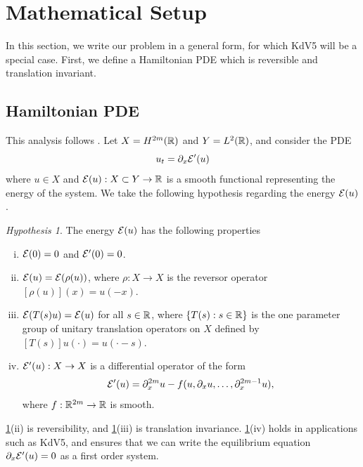 \documentclass[11pt,reqno]{amsart}
\theoremstyle{plain}
\theoremstyle{definition}
\theoremstyle{remark}
\newtheorem{hypothesis}[theorem]{Hypothesis}
\begin{document}
\section{Mathematical Setup}\label{sec:setup}

In this section, we write our problem in a general form, for which KdV5 will be a special case. First, we define a Hamiltonian PDE which is reversible and translation invariant.

\subsection{Hamiltonian PDE}\label{sec:HamPDE}

This analysis follows \cite{Grillakis1987}. Let $X = H^{2m}(\mathbb{R})$ and $Y = L^2(\mathbb{R})$, and consider the PDE
\begin{equation}\label{genPDE}
u_t = \partial_x \mathcal{E}'(u)
\end{equation}
where $u \in X$ and $\mathcal{E}(u): X \subset Y \rightarrow \mathbb{R}$ is a smooth functional representing the energy of the system. We take the following hypothesis regarding the energy $\mathcal{E}(u)$.

\begin{hypothesis}\label{Ehyp}
The energy $\mathcal{E}(u)$ has the following properties
\begin{enumerate}[(i)]
\item $\mathcal{E}(0) = 0$ and $\mathcal{E}'(0) = 0$.
\item $\mathcal{E}(u) = \mathcal{E}(\rho(u))$, where $\rho: X \rightarrow X$ is the reversor operator $[\rho(u)](x) = u(-x)$.
\item $\mathcal{E}(T(s)u) = \mathcal{E}(u)$ for all $s \in \mathbb{R}$, where $\{T(s) : s \in \mathbb{R} \}$ is the one parameter group of unitary translation operators on $X$ defined by $[T(s)]u(\cdot) = u(\cdot - s)$.
\item $\mathcal{E}'(u): X \rightarrow X$ is a differential operator of the form
\begin{equation}\label{Eprimeuform}
\mathcal{E}'(u) = \partial_x^{2m}u - f(u, \partial_x u, \dots, \partial_x^{2m-1} u),
\end{equation}
where $f: \mathbb{R}^{2m} \rightarrow \mathbb{R}$ is smooth.
\end{enumerate}
\end{hypothesis}

\noi \cref{Ehyp}(ii) is reversibility, and \cref{Ehyp}(iii) is translation invariance. \cref{Ehyp}(iv) holds in applications such as KdV5, and ensures that we can write the equilibrium equation $\partial_x \mathcal{E}'(u) = 0$ as a first order system.
\end{document}
